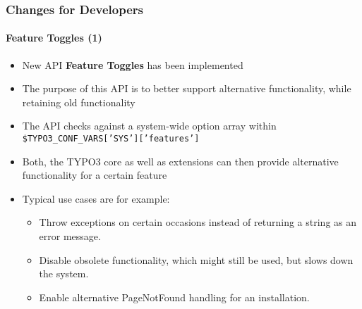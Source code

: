 
\begin{frame}[fragile]
	\frametitle{Changes for Developers}
	\framesubtitle{Feature Toggles (1)}

	\begin{itemize}
		\item New API \textbf{Feature Toggles} has been implemented
		\item The purpose of this API is to better support alternative functionality,
			while retaining old functionality
		\item The API checks against a system-wide option array within\newline
			\small
				\texttt{\$TYPO3\_CONF\_VARS['SYS']['features']}
			\normalsize
		\item Both, the TYPO3 core as well as extensions can then provide
			alternative functionality for a certain feature
		\item Typical use cases are for example:
			\smaller
			\begin{itemize}
				\item Throw exceptions on certain occasions instead of
					returning a string as an error message.
				\item Disable obsolete functionality, which might still be used,\newline
					but slows down the system.
				\item Enable alternative PageNotFound handling for an installation.
			\end{itemize}
			\normalsize

	\end{itemize}

\end{frame}


